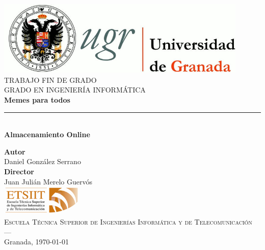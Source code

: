 \begin{titlepage}
\newlength{\centeroffset}
\setlength{\centeroffset}{-0.5\oddsidemargin}
\addtolength{\centeroffset}{0.5\evensidemargin}
\thispagestyle{empty}

\noindent\hspace*{\centeroffset}\begin{minipage}{\textwidth}

\centering
\includegraphics[width=0.9\textwidth]{logos/logo_ugr.jpg}\\[1.4cm]

\textsc{ \Large TRABAJO FIN DE GRADO\\[0.2 cm]}
\textsc{ GRADO EN INGENIERÍA INFORMÁTICA}\\[1 cm]

{\Huge\bfseries Memes para todos \\}
\noindent\rule[-1ex]{\textwidth}{3 pt}\\[3.5 ex]
{\large\bfseries Almacenamiento Online }
\end{minipage}

\vspace{2.5cm}
\noindent\hspace*{\centeroffset}
\begin{minipage}{\textwidth}
\centering

\textbf{Autor}\\ {Daniel González Serrano}\\[2.5 ex]
\textbf{Director}\\ {Juan Julián Merelo Guervós}\\[2 cm]
\includegraphics[width=0.3\textwidth]{logos/etsiit_logo.png}\\[0.1 cm]
\textsc{Escuela Técnica Superior de Ingenierías Informática y de Telecomunicación}\\
\textsc{---}\\
Granada, \today

\end{minipage}
\end{titlepage}
